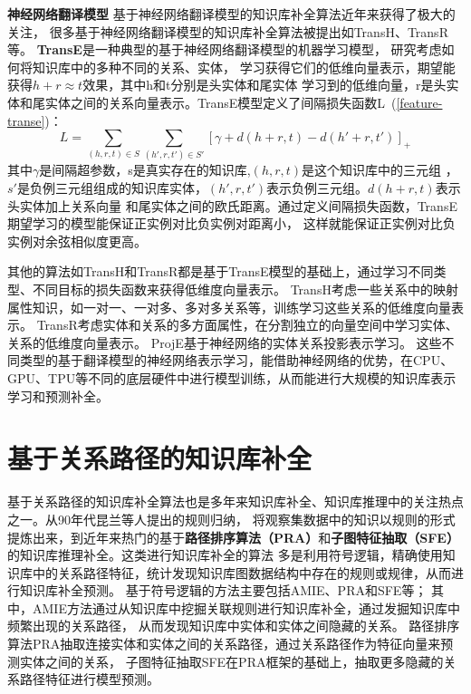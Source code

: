 \textbf{神经网络翻译模型} 基于神经网络翻译模型的知识库补全算法近年来获得了极大的关注，
很多基于神经网络翻译模型的知识库补全算法被提出如TransH、TransR等。
\textbf{TransE}是一种典型的基于神经网络翻译模型的机器学习模型，
研究考虑如何将知识库中的多种不同的关系、实体，
学习获得它们的低维向量表示，期望能获得$h+r\approx t$效果，其中h和t分别是头实体和尾实体
学习到的低维向量，r是头实体和尾实体之间的关系向量表示。TransE模型定义了间隔损失函数L~(\ref{feature-transe})：
\begin{equation}
\label{equ:chap:feature-transe}
L=\sum_{(h,r,t)\in S} \sum_{(h',r,t')\in S'}[\gamma+d(h+r,t)-d(h'+r,t')]_{+}
\end{equation}
其中$\gamma$是间隔超参数，s是真实存在的知识库,$(h,r,t)$是这个知识库中的三元组
，$s'$是负例三元组组成的知识库实体，$(h',r,t')$表示负例三元组。$d(h+r,t)$表示头实体加上关系向量
和尾实体之间的欧氏距离。通过定义间隔损失函数，TransE期望学习的模型能保证正实例对比负实例对距离小，
这样就能保证正实例对比负实例对余弦相似度更高。

其他的算法如TransH和TransR都是基于TransE模型的基础上，通过学习不同类型、不同目标的损失函数来获得低维度向量表示。
TransH考虑一些关系中的映射属性知识，如一对一、一对多、多对多关系等，训练学习这些关系的低维度向量表示。
TransR\cite{Lin2015LearningEA}考虑实体和关系的多方面属性，在分割独立的向量空间中学习实体、关系的低维度向量表示。
ProjE\cite{Shi2017ProjEEP}基于神经网络的实体关系投影表示学习。
这些不同类型的基于翻译模型的神经网络表示学习，能借助神经网络的优势，在CPU、GPU、TPU等不同的底层硬件中进行模型训练，从而能进行大规模的知识库表示学习和预测补全。

\section{基于关系路径的知识库补全}
\label{cha:symbolic}

基于关系路径的知识库补全算法也是多年来知识库补全、知识库推理中的关注热点之一。从90年代昆兰等人提出的规则归纳，
将观察集数据中的知识以规则的形式提炼出来，到近年来热门的基于\textbf{路径排序算法（PRA）}和\textbf{子图特征抽取（SFE）}的知识库推理补全。这类进行知识库补全的算法
多是利用符号逻辑，精确使用知识库中的关系路径特征，统计发现知识库图数据结构中存在的规则或规律，从而进行知识库补全预测。
基于符号逻辑的方法主要包括AMIE\cite{Galrraga2013AMIEAR}、PRA\cite{Lao2010}和SFE\cite{Gardner2015}等；
其中，AMIE方法通过从知识库中挖掘关联规则进行知识库补全，通过发掘知识库中频繁出现的关系路径，
从而发现知识库中实体和实体之间隐藏的关系。
路径排序算法PRA抽取连接实体和实体之间的关系路径，通过关系路径作为特征向量来预测实体之间的关系，
子图特征抽取SFE在PRA框架的基础上，抽取更多隐藏的关系路径特征进行模型预测。

